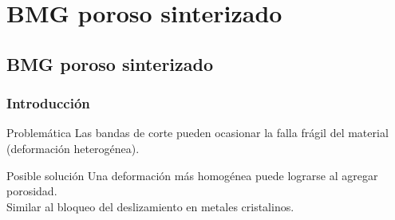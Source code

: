 
\section[BMG poroso]{BMG poroso sinterizado}
\subsection{BMG poroso sinterizado}

\begin{frame}
    \frametitle{Introducci\'on}
    \vspace{0.2cm}
    \begin{block}{Problem\'atica}
      Las bandas de corte pueden ocasionar la falla fr\'agil del material (deformaci\'on heterog\'enea).
    \end{block}
    \begin{block}{Posible soluci\'on}
     Una deformaci\'on m\'as homog\'enea puede lograrse al agregar porosidad.\\
     Similar al bloqueo del deslizamiento en metales cristalinos.
    \end{block}
\end{frame}


